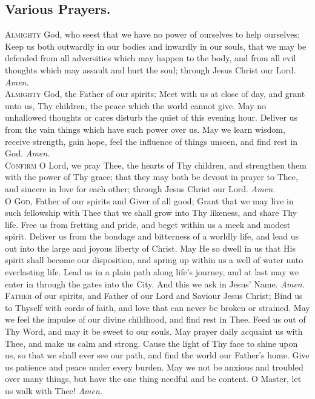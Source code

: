 \subsection*{Various Prayers.} 

\lettrine{A}{lmighty} God, who seest that we have no power of
ourselves to help ourselves; Keep us both outwardly
in our bodies and inwardly in our souls, that we may be
defended from all adversities which may happen to the
body, and from all evil thoughts which may assault and
hurt the soul; through Jesus Christ our Lord.
\textit{Amen.} \\

\lettrine{A}{lmighty} God, the Father of our spirits; Meet with us
at close of day, and grant unto us, Thy children, the
peace which the world cannot give. May no unhallowed
thoughts or cares disturb the quiet of this evening hour.
Deliver us from the vain things which have such power
over us. May we learn wisdom, receive strength, gain
hope, feel the influence of things unseen, and find rest in
God.
\textit{Amen.} \\

\lettrine{C}{onfirm} O Lord, we pray Thee, the hearts of Thy
children, and strengthen them with the power of Thy
grace; that they may both be devout in prayer to Thee,
and sincere in love for each other; through Jesus Christ
our Lord.
\textit{Amen.} \\

\lettrine{O}{ God,} Father of our spirits and Giver of all good; Grant
that we may live in such fellowship with Thee that
we shall grow into Thy likeness, and share Thy life. Free
us from fretting and pride, and beget within us a meek
and modest spirit. Deliver us from the bondage and bitterness of a worldly life, and lead us out into the large and
joyous liberty of Christ. May He so dwell in us that His
spirit shall become our disposition, and spring up within
us a well of water unto everlasting life. Lead us in a plain
path along life’s journey, and at last may we enter in
through the gates into the City. And this we ask in Jesus’ Name.
\textit{Amen.} \\

\lettrine{F}{ather} of our spirits, and Father of our Lord and Saviour Jesus Christ; Bind us to Thyself with cords of
faith, and love that can never be broken or strained. May
we feel the impulse of our divine childhood, and find rest in
Thee. Feed us out of Thy Word, and may it be sweet to
our souls. May prayer daily acquaint us with Thee, and
make us calm and strong. Cause the light of Thy face to
shine upon us, so that we shall ever see our path, and find
the world our Father’s home. Give us patience and peace
under every burden. May we not be anxious and troubled
over many things, but have the one thing needful and be
content. O Master, let us walk with Thee!
\textit{Amen.} \\

